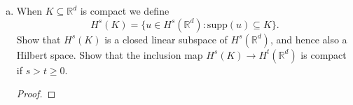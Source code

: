 \documentclass[11pt,letterpaper]{report}
\newcommand{\reals}{\mathbb{R}}
\newcommand{\mcal}[1]{\mathcal{#1}}
\newcommand{\supp}{\text{supp}}
\begin{document}
\begin{enumerate}[(a)]
\begin{proof}
		\noindent We claim that $u_n$ converges to $\mcal{F}^{-1}(v(\xi)\cdot \langle \xi\rangle^{-s})$ in $H^s(\reals^d)$. It was designed for this purpose after all.
		\begin{align*}
			\|u_n - \mcal{F}^{-1}(v(\xi)\cdot \langle \xi\rangle^{-s})\|_{H^s}^2 &= \frac{1}{(2\pi)^d}\int |\widehat{u_n}(\xi) - v(\xi)\cdot \langle \xi\rangle^{-s}|^2\cdot \langle \xi\rangle^{2s}\ d\xi\\
			&= \frac{1}{(2\pi)^d}\int|\widehat{u_n}(\xi)\cdot \langle \xi\rangle^s - v(\xi)|^2\ d\xi\\
			&\to 0.
		\end{align*}
		That $\mcal{F}^{-1}(v(\xi)\cdot \langle \xi\rangle^{-s})$ is in $H^s(\reals^d)$ follows immediately from $v$ being in $L^2(\reals^d)$. Thus, $H^s(\reals^d)$ is complete.
	\end{proof}

	\item When $K\subseteq \reals^d$ is compact we define
	\[
	H^s(K) = \{u\in H^s(\reals^d): \supp(u)\subseteq K\}.
	\]
	Show that $H^s(K)$ is a closed linear subspace of $H^s(\reals^d)$, and hence also a Hilbert space. Show that the inclusion map $H^s(K)\to H^t(\reals^d)$ is compact if $s>t\geq 0$.
	\begin{proof}
		
	\end{proof}
\end{enumerate}
\end{document}
